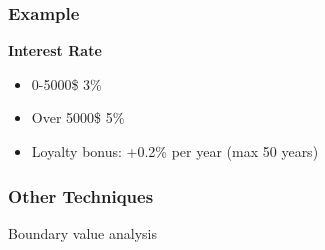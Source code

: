 \begin{frame}
    \frametitle{Example}
    \textbf{Interest Rate}\\
    \begin{itemize}
        \item 0-5000\$ 3\%
        \item Over 5000\$ 5\%
        \item Loyalty bonus: +0.2\% per year (max 50 years)
    \end{itemize}
\end{frame}

\begin{frame}
    \frametitle{Other Techniques}
    Boundary value analysis
\end{frame}


